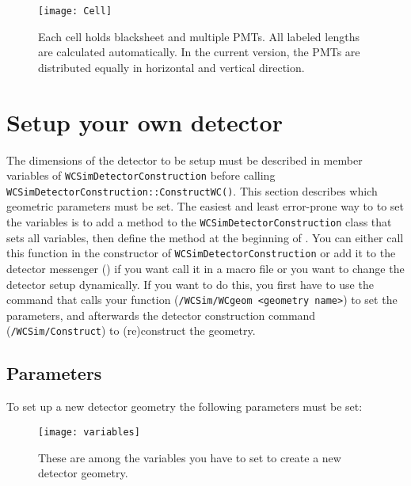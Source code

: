\begin{figure}[p]
  \begin{center}
\texttt{[image: Cell]}
  \end{center}
\caption{Each cell holds blacksheet and multiple PMTs. All labeled lengths are calculated automatically. In the current version, the PMTs are distributed equally in horizontal and vertical direction.}
\end{figure}



\section{Setup your own detector}

The dimensions of the detector to be setup must be described in member variables of  \texttt{WCSimDetectorConstruction} before calling  \texttt{WCSimDetectorConstruction::ConstructWC()}. This section describes which geometric parameters must be set. The easiest and least error-prone way to to set the variables is to add a method to the \texttt{WCSimDetectorConstruction} class that sets all variables, then define the method at the beginning of .
You can either call this function in the constructor of \texttt{WCSimDetectorConstruction} or add it to the detector messenger () if you want call it in a macro file or you want to change the detector setup dynamically. If you want to do this, you first have to use the command that calls your function (\texttt{/WCSim/WCgeom <geometry name>}) to set the parameters, and afterwards the detector construction command (\texttt{/WCSim/Construct}) to (re)construct the geometry.

\subsection{Parameters}\label{sec:param}
To set up a new detector geometry the following parameters must be set:

\begin{figure}
  \begin{center}
\texttt{[image: variables]}
  \end{center}
\caption{These are among the variables you have to set to create a new detector geometry.}\label{fig:geom}
\end{figure}


